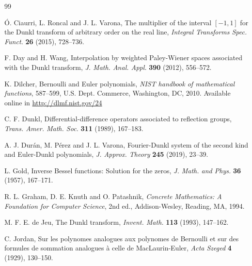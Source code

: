 \documentclass[11pt]{article}
\theoremstyle{plain}
\theoremstyle{remark}
\numberwithin{equation}{section} %
\begin{document}
\begin{thebibliography}{99}

\'O. Ciaurri, L. Roncal and J. L. Varona,
The multiplier of the interval $[-1,1]$ for the Dunkl transform of arbitrary order on the real line, \textit{Integral Transforms Spec. Funct.} 
\textbf{26} (2015), 728--736.

F. Day and H. Wang, 
Interpolation by weighted Paley-Wiener spaces associated with the Dunkl transform, 
\textit{J. Math. Anal. Appl.} \textbf{390} (2012), 556--572. 

K. Dilcher,
Bernoulli and Euler polynomials,
\textit{NIST handbook of mathematical functions},
587--599, %
U.S. Dept. Commerce, Washington, DC, 2010.
Available online in \url{http://dlmf.nist.gov/24}

C. F. Dunkl,
{Differential-difference operators associated to reflection groups},
\textit{Trans. Amer. Math. Soc.}
\textbf{311} (1989), 167--183.

A. J. Dur\'an, M. P\'erez and J. L. Varona,
Fourier-Dunkl system of the second kind and Euler-Dunkl polynomials,
\textit{J. Approx. Theory}
\textbf{245} (2019), 23--39.


L. Gold,
{Inverse Bessel functions: Solution for the zeros},
\textit{J. Math. and Phys.}
\textbf{36} (1957), 167--171.

R. L. Graham, D. E. Knuth and O. Patashnik,
\textit{Concrete Mathematics: A Foundation for Computer Science}, 2nd ed.,
Addison-Wesley, Reading, MA, 1994.

M. F. E. de Jeu,
{The Dunkl transform},
\textit{Invent. Math.}
\textbf{113} (1993), 147--162.

C. Jordan,
Sur les polynomes analogues aux polynomes de Bernoulli et sur des formules de sommation analogues \`a celle de MacLaurin-Euler,
\textit{Acta Szeged} 
\textbf{4} (1929), 130--150.


\end{thebibliography}
\end{document}
